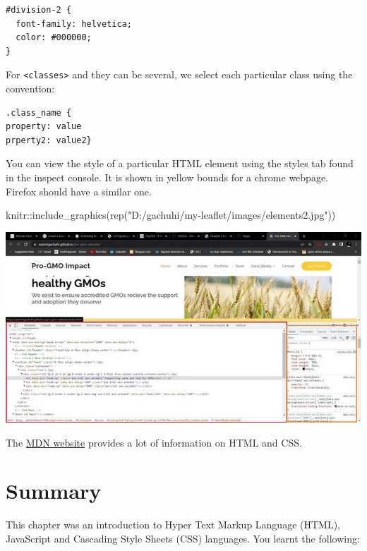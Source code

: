 \documentclass[
]{book}
\newenvironment{Shaded}{\begin{snugshade}}{\end{snugshade}}
\newcommand{\FunctionTok}[1]{\textcolor[rgb]{0.00,0.00,0.00}{#1}}
\newcommand{\NormalTok}[1]{#1}
\newcommand{\SpecialCharTok}[1]{\textcolor[rgb]{0.00,0.00,0.00}{#1}}
\newcommand{\StringTok}[1]{\textcolor[rgb]{0.31,0.60,0.02}{#1}}
\begin{document}
\begin{verbatim}
#division-2 {
  font-family: helvetica;
  color: #000000;
}
\end{verbatim}

For \texttt{\textless{}classes\textgreater{}} and they can be several, we select each particular class using the convention:

\begin{verbatim}
.class_name {
property: value
prperty2: value2}
\end{verbatim}

You can view the style of a particular HTML element using the styles tab found in the inspect console. It is shown in yellow bounds for a chrome webpage. Firefox should have a similar one.

\begin{Shaded}
\begin{Highlighting}[]
\NormalTok{knitr}\SpecialCharTok{::}\FunctionTok{include\_graphics}\NormalTok{(}\FunctionTok{rep}\NormalTok{(}\StringTok{"D:/gachuhi/my{-}leaflet/images/elements2.jpg"}\NormalTok{))}
\end{Highlighting}
\end{Shaded}

\includegraphics[width=11.11in]{../images/elements2}

The \href{https://developer.mozilla.org/en-US/docs/Learn/CSS/First_steps/How_CSS_is_structured}{MDN website} provides a lot of information on HTML and CSS.

\hypertarget{summary}{%
\section{Summary}\label{summary}}

This chapter was an introduction to Hyper Text Markup Language (HTML), JavaScript and Cascading Style Sheets (CSS) languages. You learnt the following:
\end{document}
